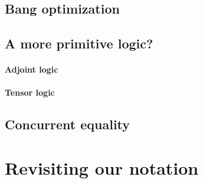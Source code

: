 \subsection{Bang optimization}

\subsection{A more primitive logic?}

\paragraph{Adjoint logic}

\paragraph{Tensor logic}

\subsection{Concurrent equality}

\section{Revisiting our notation}

